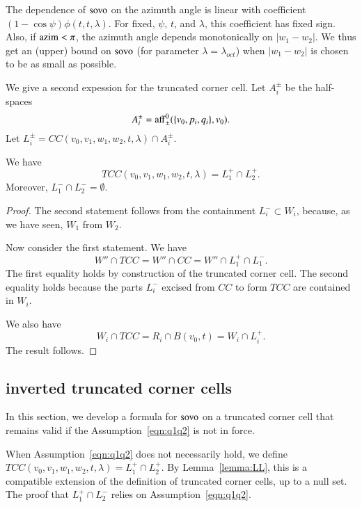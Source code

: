 The dependence of ${\operatorname{sovo}}$ on the azimuth angle
is linear with coefficient $(1-\cos\psi)\phi(t,t,\lambda)$.
For fixed, $\psi$, $t$, and $\lambda$, this coefficient
has fixed sign.  Also, if ${\operatorname{azim}}<\pi$, the azimuth
angle depends monotonically on $|w_1-w_2|$.  We thus get
an (upper) bound on ${\operatorname{sovo}}$ (for parameter $\lambda=\lambda_{oct}$)
when $|w_1-w_2|$ is chosen to be as small as possible.

\medskip

We give a second expession for the truncated corner cell.
Let $A_i^\pm$ be the half-spaces
$$
  A_i^\pm = {\operatorname{aff}}_\pm^0(\{v_0,p_i,q_i\},v_0).
$$
Let $L_i^\pm = CC(v_0,v_1,w_1,w_2,t,\lambda)\cap A_i^\pm$.

\begin{lemma}\label{lemma:LL}
We have
  $$
  TCC(v_0,v_1,w_1,w_2,t,\lambda) = L_1^+\cap L_2^+.
  $$
Moreover, 
$L_1^-\cap L_2^- =\emptyset$.
\end{lemma}

\begin{proof}
The second statement follows from the containment
   $L_i^- \subset W_i$, because, as we have seen,
$W_1$
from $W_2$.

Now consider the first statement.  
We have
 $$
 W'' \cap TCC = W'' \cap CC = W'' \cap L_1^+ \cap L_1^-.
 $$
The first equality holds by construction of the truncated corner
cell.  The second equality holds because the parts $L_i^-$ excised
from $CC$ to form $TCC$ are contained in $W_i$.

We also have
  $$
  W_i \cap TCC = R_i \cap B(v_0,t) = W_i \cap L_i^+.
  $$
The result follows.
\end{proof}




\subsection{inverted truncated corner cells}

In this section, we develop a formula for ${\operatorname{sovo}}$ on 
a truncated corner cell that remains valid if the 
Assumption~\ref{eqn:q1q2} is not in force.



When Assumption~\ref{eqn:q1q2} does not necessarily hold, we
define $TCC(v_0,v_1,w_1,w_2,t,\lambda) = L_1^+ \cap L_2^+$.
By Lemma~\ref{lemma:LL}, 
this is a compatible extension of the definition
of truncated corner cells, up to a null set.
The proof that $L_1^+\cap L_2^-$ relies on Assumption~\ref{eqn:q1q2}.

